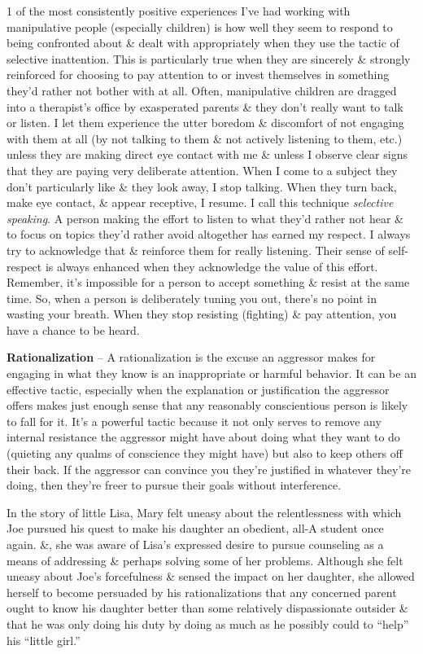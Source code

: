 \documentclass{article}
\numberwithin{equation}{section}
\begin{document}
1 of the most consistently positive experiences I've had working with manipulative people (especially children) is how well they seem to respond to being confronted about \& dealt with appropriately when they use the tactic of selective inattention. This is particularly true when they are sincerely \& strongly reinforced for choosing to pay attention to or invest themselves in something they'd rather not bother with at all. Often, manipulative children are dragged into a therapist's office by exasperated parents \& they don't really want to talk or listen. I let them experience the utter boredom \& discomfort of not engaging with them at all (by not talking to them \& not actively listening to them, etc.) unless they are making direct eye contact with me \& unless I observe clear signs that they are paying very deliberate attention. When I come to a subject they don't particularly like \& they look away, I stop talking. When they turn back, make eye contact, \& appear receptive, I resume. I call this technique \textit{selective speaking}. A person making the effort to listen to what they'd rather not hear \& to focus on topics they'd rather avoid altogether has earned my respect. I always try to acknowledge that \& reinforce them for really listening. Their sense of self-respect is always enhanced when they acknowledge the value of this effort. Remember, it's impossible for a person to accept something \& resist at the same time. So, when a person is deliberately tuning you out, there's no point in wasting your breath. When they stop resisting (fighting) \& pay attention, you have a chance to be heard.

\textbf{Rationalization} -- A rationalization is the excuse an aggressor makes for engaging in what they know is an inappropriate or harmful behavior. It can be an effective tactic, especially when the explanation or justification the aggressor offers makes just enough sense that any reasonably conscientious person is likely to fall for it. It's a powerful tactic because it not only serves to remove any internal resistance the aggressor might have about doing what they want to do (quieting any qualms of conscience they might have) but also to keep others off their back. If the aggressor can convince you they're justified in whatever they're doing, then they're freer to pursue their goals without interference.

In the story of little Lisa, Mary felt uneasy about the relentlessness with which Joe pursued his quest to make his daughter an obedient, all-A student once again. \&, she was aware of Lisa's expressed desire to pursue counseling as a means of addressing \& perhaps solving some of her problems. Although she felt uneasy about Joe's forcefulness \& sensed the impact on her daughter, she allowed herself to become persuaded by his rationalizations that any concerned parent ought to know his daughter better than some relatively dispassionate outsider \& that he was only doing his duty by doing as much as he possibly could to ``help'' his ``little girl.''
\end{document}
